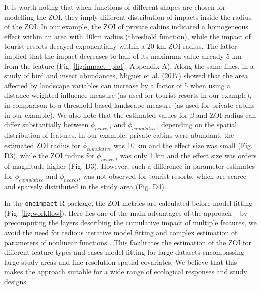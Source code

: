 \documentclass[titlepage]{article}
\begin{document}
It is worth noting that when functions of different shapes are chosen for modelling the ZOI, they imply different distribution of impacts inside the radius of the ZOI. In our example, the ZOI of private cabins indicated a homogeneous effect within an area with 10km radius (threshold function), while the impact of tourist resorts decayed exponentially within a 20 km ZOI radius. The latter implied that the impact decreases to half of its maximum value already 5 km from the feature (Fig. \ref{fig:impact_plot}, Appendix A). Along the same lines, in a study of bird and insect abundances, Miguet et al. (2017) showed that the area affected by landscape variables can increase by a factor of 5 when using a distance-weighted influence measure (as used for tourist resorts in our example), in comparison to a threshold-based landscape measure (as used for private cabins in our example). We also note that the estimated values for $\beta$ and ZOI radius can differ substantially between $\phi_{nearest}$ and $\phi_{cumulative}$, depending on the spatial distribution of features. In our example, private cabins were abundant, the estimated ZOI radius for $\phi_{cumulative}$ was 10 km and the effect size was small (Fig. D3), while the ZOI radius for $\phi_{nearest}$ was only 1 km and the effect size was orders of magnitude higher (Fig. D3). However, such a difference in parameter estimates for $\phi_{cumulative}$ and $\phi_{nearest}$ was not observed for tourist resorts, which are scarce and sparsely distributed in the study area (Fig. D4).

In the \verb|oneimpact| R package, the ZOI metrics are calculated before model fitting (Fig. \ref{fig:workflow}). Here lies one of the main advantages of the approach – by precomputing the layers describing the cumulative impact of multiple features, we avoid the need for tedious iterative model fitting and complex estimation of parameters of nonlinear functions \citep{lee_estimating_2020,lowe_scalescape_2022}. This facilitates the estimation of the ZOI for different feature types and eases model fitting for large datasets \citep[e.g.][]{tucker_moving_2018} encompassing large study areas and fine-resolution spatial covariates. We believe that this makes the approach suitable for a wide range of ecological responses and study designs. 
\end{document}
